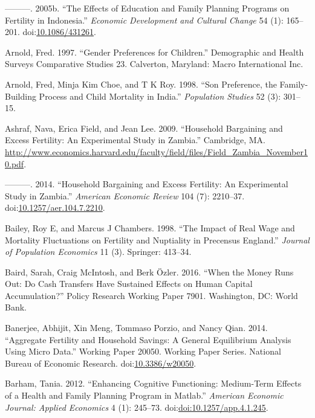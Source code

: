 \documentclass[]{article}
\begin{document}
\hypertarget{ref-Angeles2005}{}
---------. 2005b. ``The Effects of Education and Family Planning Programs on Fertility in Indonesia.'' \emph{Economic Development and Cultural Change} 54 (1): 165--201. doi:\href{https://doi.org/10.1086/431261}{10.1086/431261}.

\hypertarget{ref-Arnold1997}{}
Arnold, Fred. 1997. ``Gender Preferences for Children.'' Demographic and Health Surveys Comparative Studies 23. Calverton, Maryland: Macro International Inc.

\hypertarget{ref-arnold98}{}
Arnold, Fred, Minja Kim Choe, and T K Roy. 1998. ``Son Preference, the Family-Building Process and Child Mortality in India.'' \emph{Population Studies} 52 (3): 301--15.

\hypertarget{ref-Ashraf2009}{}
Ashraf, Nava, Erica Field, and Jean Lee. 2009. ``Household Bargaining and Excess Fertility: An Experimental Study in Zambia.'' Cambridge, MA. \url{http://www.economics.harvard.edu/faculty/field/files/Field_Zambia_November10.pdf}.

\hypertarget{ref-Ashraf2014}{}
---------. 2014. ``Household Bargaining and Excess Fertility: An Experimental Study in Zambia.'' \emph{American Economic Review} 104 (7): 2210--37. doi:\href{https://doi.org/10.1257/aer.104.7.2210}{10.1257/aer.104.7.2210}.

\hypertarget{ref-Bailey1998}{}
Bailey, Roy E, and Marcus J Chambers. 1998. ``The Impact of Real Wage and Mortality Fluctuations on Fertility and Nuptiality in Precensus England.'' \emph{Journal of Population Economics} 11 (3). Springer: 413--34.

\hypertarget{ref-Baird2016}{}
Baird, Sarah, Craig McIntosh, and Berk Özler. 2016. ``When the Money Runs Out: Do Cash Transfers Have Sustained Effects on Human Capital Accumulation?'' Policy Research Working Paper 7901. Washington, DC: World Bank.

\hypertarget{ref-Banerjee2014}{}
Banerjee, Abhijit, Xin Meng, Tommaso Porzio, and Nancy Qian. 2014. ``Aggregate Fertility and Household Savings: A General Equilibrium Analysis Using Micro Data.'' Working Paper 20050. Working Paper Series. National Bureau of Economic Research. doi:\href{https://doi.org/10.3386/w20050}{10.3386/w20050}.

\hypertarget{ref-Barham2012}{}
Barham, Tania. 2012. ``Enhancing Cognitive Functioning: Medium-Term Effects of a Health and Family Planning Program in Matlab.'' \emph{American Economic Journal: Applied Economics} 4 (1): 245--73. doi:\href{https://doi.org/doi:10.1257/app.4.1.245}{doi:10.1257/app.4.1.245}.
\end{document}
